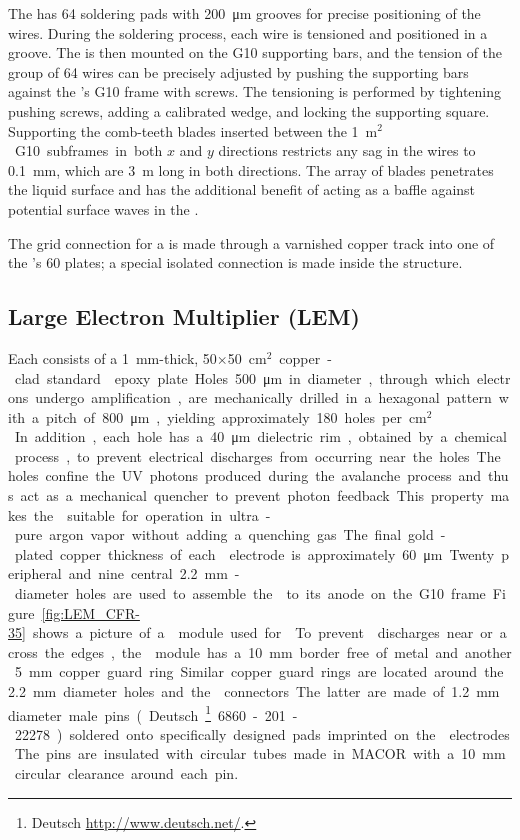 The  has \num{64} soldering pads with \SI{200}{\micro\meter} grooves for precise positioning of the wires. During the 
soldering process, each wire is tensioned and positioned in a groove. The  is then mounted on the G10 supporting bars, and the tension of the group of \num{64} wires can be precisely adjusted by pushing the supporting bars against the 's G10 frame with screws. The tensioning is performed by tightening pushing screws, adding a calibrated wedge, and locking the supporting square.
Supporting the comb-teeth blades inserted between the \SI{1}{m$^2$} G10 subframes in both $x$ and $y$ directions restricts any sag in the wires to \SI{0.1}{mm}, which are \SI{3}{m} long in both directions. The array of blades penetrates the liquid surface and has the additional benefit of acting as a baffle against potential surface waves in the .

The grid  connection for a  is made through a varnished copper track into one of the 's \num{60}  plates; a special isolated connection  is made inside the  structure.

\subsection{Large Electron Multiplier (LEM)}
\label{sec:fddp-crp-lem}

Each  consists of a \SI{1}{mm}-thick,  \num{50}$\times$\SI{50}{cm$^{2}$} copper-clad standard  epoxy plate. Holes \SI{500}{\micro\meter} in diameter, through which electrons undergo amplification, are mechanically drilled in a hexagonal pattern with a pitch of \SI{800}{\micro\meter}, yielding approximately \num{180} holes per \si{cm$^2$}. In addition, each hole has a  \SI{40}{\micro\meter} dielectric rim, obtained by a chemical process, to prevent electrical discharges from occurring near the holes. The holes confine the UV photons produced during the avalanche process and thus act as a mechanical quencher to prevent photon feedback. This property makes the  suitable for operation in ultra-pure argon vapor without adding a quenching gas. The final gold-plated copper thickness of each  electrode is approximately  \SI{60}{\micro\meter}. Twenty peripheral and nine central \SI{2.2}{mm}-diameter holes are used to assemble the   to its anode on the G10 frame. Figure~\ref{fig:LEM_CFR-35} shows a picture of a  module used for  . To prevent  discharges near or across the edges, the  module has a  \SI{10}{mm} border free of metal and another \SI{5}{mm} copper guard ring. Similar copper guard rings are located around the \SI{2.2}{mm} diameter holes and the  connectors. The latter are made of \SI{1.2}{mm} diameter male pins (Deutsch\footnote{Deutsch\texttrademark{} \url{http://www.deutsch.net/}.} 6860-201-22278.) soldered onto specifically designed pads imprinted on the  electrodes. The pins are insulated with circular tubes made in MACOR with a \SI{10}{mm} circular clearance around each pin. 

